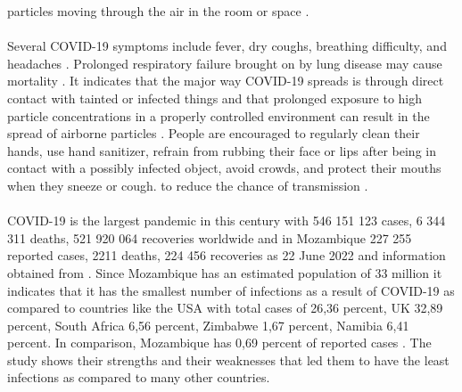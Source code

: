 \documentclass{article}
\begin{document}
particles moving through the air in the room or space \citep{sumbana2020air}.\\\\ 

Several COVID-19 symptoms include fever, dry coughs, breathing difficulty, and headaches \citep{drosten2003identification}. Prolonged respiratory failure brought on by lung disease may cause mortality \citep{tsang2003cluster}. It indicates that the major way COVID-19 spreads is through direct contact with tainted or infected things and that prolonged exposure to high particle concentrations in a properly controlled environment can result in the spread of airborne particles \citep{wang2020covid}. People are encouraged to regularly clean their hands, use hand sanitizer, refrain from rubbing their face or lips after being in contact with a possibly infected object, avoid crowds, and protect their mouths when they sneeze or cough. to reduce the chance of transmission \citep{guner2020covid}.\\\\COVID-19 is the largest pandemic in this century with 546 151 123 cases, 6 344 311 deaths, 521 920 064 recoveries worldwide and in Mozambique 227 255 reported cases, 2211 deaths, 224 456 recoveries as 22 June 2022 and information obtained from \citep{Worldometer}. Since Mozambique has an estimated population of 33 million it indicates that it has the smallest number of infections as a result of COVID-19 as compared to countries like the USA with total cases of 26,36 percent, UK 32,89 percent, South Africa 6,56 percent, Zimbabwe 1,67 percent, Namibia 6,41 percent. In comparison, Mozambique has 0,69 percent of reported cases \citep{Worldometer}. The study shows their strengths and their weaknesses that led them to have the least infections as compared to many other countries.
\end{document}
